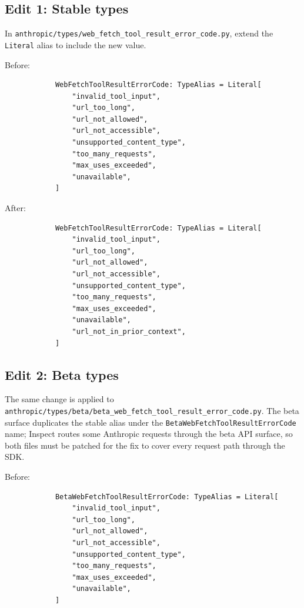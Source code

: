 \documentclass[10pt]{article} %
\begin{document}
        \subsection{Edit 1: Stable types}
        
            In \texttt{anthropic/types/web\_fetch\_tool\_result\_error\_code.py}, extend the \texttt{Literal} alias to include the new value.
            
            Before:
            \begin{verbatim}
            WebFetchToolResultErrorCode: TypeAlias = Literal[
                "invalid_tool_input",
                "url_too_long",
                "url_not_allowed",
                "url_not_accessible",
                "unsupported_content_type",
                "too_many_requests",
                "max_uses_exceeded",
                "unavailable",
            ]
            \end{verbatim}
            
            After:
            \begin{verbatim}
            WebFetchToolResultErrorCode: TypeAlias = Literal[
                "invalid_tool_input",
                "url_too_long",
                "url_not_allowed",
                "url_not_accessible",
                "unsupported_content_type",
                "too_many_requests",
                "max_uses_exceeded",
                "unavailable",
                "url_not_in_prior_context",
            ]
            \end{verbatim}
        
        \subsection{Edit 2: Beta types}
        
            The same change is applied to \texttt{anthropic/types/beta/beta\_web\_fetch\_tool\_result\_error\_code.py}. The beta surface duplicates the stable alias under the \texttt{BetaWebFetchToolResultErrorCode} name; Inspect routes some Anthropic requests through the beta API surface, so both files must be patched for the fix to cover every request path through the SDK.
            
            Before:
            \begin{verbatim}
            BetaWebFetchToolResultErrorCode: TypeAlias = Literal[
                "invalid_tool_input",
                "url_too_long",
                "url_not_allowed",
                "url_not_accessible",
                "unsupported_content_type",
                "too_many_requests",
                "max_uses_exceeded",
                "unavailable",
            ]
            \end{verbatim}
            
\end{document}
